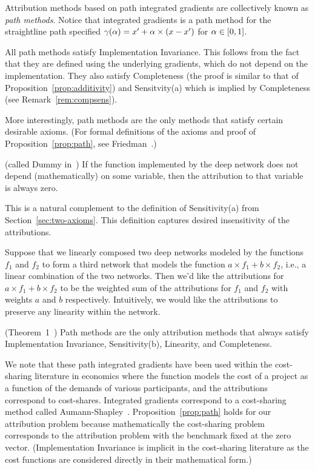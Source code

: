 Attribution methods based on path integrated gradients are collectively
known as \emph{path methods}. 
Notice that integrated gradients is a path method
for the straightline path specified $\gamma(\alpha) = x' + \alpha\times(x-x')$
for $\alpha \in [0,1]$.

\begin{remark}
  All path methods satisfy Implementation Invariance. This follows from
  the fact that they are defined using the underlying gradients, which
  do not depend on the implementation. They also satisfy Completeness
  (the proof is similar
  to that of Proposition~\ref{prop:additivity})
  and Sensitvity(a) which is implied by Completeness
  (see Remark~\ref{rem:compsens}).
\end{remark}

More interestingly, path methods are the only methods
that satisfy certain desirable axioms. (For formal definitions of the
axioms and proof of Proposition~\ref{prop:path}, see
Friedman~\cite{Friedman}.)

 (called Dummy in~\cite{Friedman}) If the
function implemented by the deep network does not depend (mathematically)
on some variable, then the attribution to that variable is always
zero.

This is a natural complement to the definition of Sensitivity(a) from
Section~\ref{sec:two-axioms}. This definition captures desired
insensitivity of the attributions.

Suppose that we linearly composed two deep networks modeled by the
functions $f_1$ and $f_2$ to form a third network that models the
function $a\times f_1 + b\times f_2$, i.e., a linear
combination of the two networks. Then we'd like the attributions for
$a\times f_1 + b\times f_2$ to be the weighted sum of the attributions
for $f_1$ and $f_2$ with weights $a$ and $b$
respectively. Intuitively, we would like the attributions to preserve
any linearity within the network.

  \begin{proposition}(Theorem~1~\cite{Friedman})
    \label{prop:path}
  Path methods are the only
  attribution methods that always satisfy Implementation Invariance,
  Sensitivity(b), Linearity, and Completeness.
\end{proposition}

\begin{remark}
  We note that these path integrated gradients have been used within
  the cost-sharing literature in economics where the function models the
  cost of a project as a function of the
  demands of various participants, and the attributions correspond to
  cost-shares. Integrated gradients correspond to a cost-sharing
  method called Aumann-Shapley~\cite{AS74}.
  Proposition~\ref{prop:path} holds for our attribution problem
  because mathematically the cost-sharing problem corresponds to the
  attribution problem with the benchmark fixed at the zero vector.
  (Implementation Invariance is implicit in the cost-sharing literature
  as the cost functions are considered directly in their mathematical
  form.)
\end{remark}

